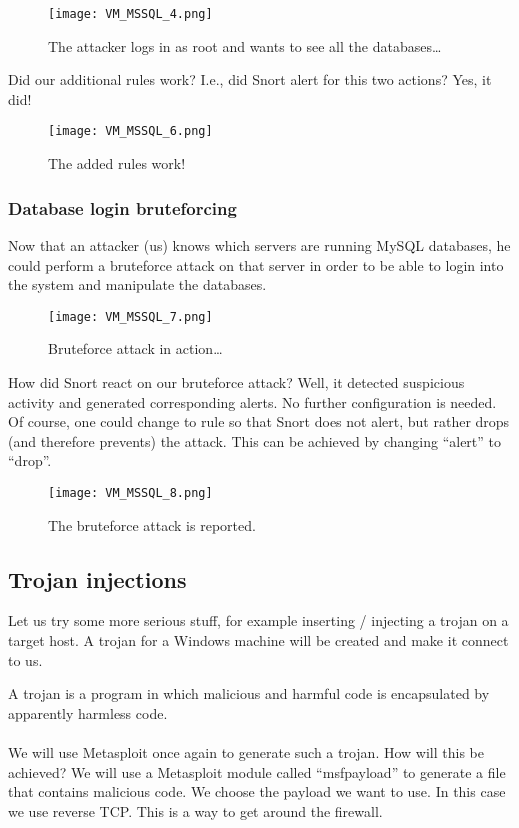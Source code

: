 \begin{figure}[h]
    \centering
    \texttt{[image: VM\_MSSQL\_4.png]}
    \caption{The attacker logs in as root and wants to see all the databases\ldots}
\end{figure}

Did our additional rules work? I.e., did Snort alert for this two actions? Yes, it did!

\begin{figure}[h]
    \centering
    \texttt{[image: VM\_MSSQL\_6.png]}
    \caption{The added rules work!}
\end{figure}

\clearpage

\subsubsection{Database login bruteforcing}

Now that an attacker (us) knows which servers are running MySQL databases, he could perform a bruteforce attack on that server in order to be able to login into the system and manipulate the databases.

\begin{figure}[h]
    \centering
    \texttt{[image: VM\_MSSQL\_7.png]}
    \caption{Bruteforce attack in action\ldots}
\end{figure}
How did Snort react on our bruteforce attack? Well, it detected suspicious activity and generated corresponding alerts. No further configuration is needed. Of course, one could change to rule so that Snort does not alert, but rather drops (and therefore prevents) the attack. This can be achieved by changing ``alert'' to ``drop''.
\begin{figure}[h]
    \centering
    \texttt{[image: VM\_MSSQL\_8.png]}
    \caption{The bruteforce attack is reported.}
\end{figure}

\clearpage

\subsection{Trojan injections}

Let us try some more serious stuff, for example inserting / injecting a trojan on a target host. A trojan for a Windows machine will be created and make it connect to us.

A trojan is a program in which malicious and harmful code is encapsulated by apparently harmless code. \\ \\
We will use Metasploit once again to generate such a trojan. How will this be achieved? We will use a Metasploit module called ``msfpayload'' to generate a file that contains malicious code. We choose the payload we want to use. In this case we use reverse TCP. This is a way to get around the firewall.

